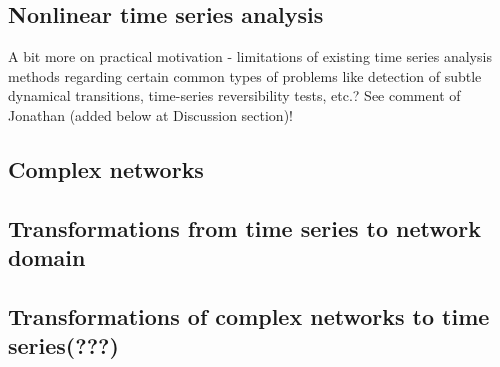 \subsection{Nonlinear time series analysis}

A bit more on practical motivation - limitations of existing time series
analysis methods regarding certain common types of problems like detection of
subtle dynamical transitions, time-series reversibility tests, etc.? See comment
of Jonathan (added below at Discussion section)!

\subsection{Complex networks}

\subsection{Transformations from time series to network domain}
\cite{Donner2010NJP,marwan2007}

\subsection{Transformations of complex networks to time series(???)}
